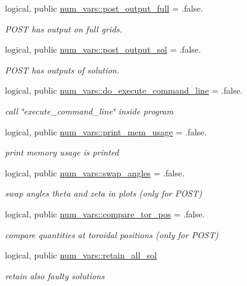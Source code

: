 \begin{DoxyCompactItemize}
logical, public \hyperlink{namespacenum__vars_a7d65e7e9a9c8d9882929fc014b81a81b}{num\+\_\+vars\+::post\+\_\+output\+\_\+full} = .false.
\begin{DoxyCompactList}\small\item\em P\+O\+ST has output on full grids. \end{DoxyCompactList}\item 
logical, public \hyperlink{namespacenum__vars_a500deb6ae4c6ba1171c44513e1aac62b}{num\+\_\+vars\+::post\+\_\+output\+\_\+sol} = .false.
\begin{DoxyCompactList}\small\item\em P\+O\+ST has outputs of solution. \end{DoxyCompactList}\item 
logical, public \hyperlink{namespacenum__vars_ad5ba241cde0a99cdd5b3d6a6c0340e5c}{num\+\_\+vars\+::do\+\_\+execute\+\_\+command\+\_\+line} = .false.
\begin{DoxyCompactList}\small\item\em call \char`\"{}execute\+\_\+command\+\_\+line\char`\"{} inside program \end{DoxyCompactList}\item 
logical, public \hyperlink{namespacenum__vars_a28bf4f706f43af630ecc697dec01654c}{num\+\_\+vars\+::print\+\_\+mem\+\_\+usage} = .false.
\begin{DoxyCompactList}\small\item\em print memory usage is printed \end{DoxyCompactList}\item 
logical, public \hyperlink{namespacenum__vars_adaf8e128a1b232b8231305be41a55bdc}{num\+\_\+vars\+::swap\+\_\+angles} = .false.
\begin{DoxyCompactList}\small\item\em swap angles theta and zeta in plots (only for P\+O\+ST) \end{DoxyCompactList}\item 
logical, public \hyperlink{namespacenum__vars_a2f303733b113f96fad56bb8ceb337c85}{num\+\_\+vars\+::compare\+\_\+tor\+\_\+pos} = .false.
\begin{DoxyCompactList}\small\item\em compare quantities at toroidal positions (only for P\+O\+ST) \end{DoxyCompactList}\item 
logical, public \hyperlink{namespacenum__vars_adc6255c76bb27f763817adc8e2d80658}{num\+\_\+vars\+::retain\+\_\+all\+\_\+sol}
\begin{DoxyCompactList}\small\item\em retain also faulty solutions \end{DoxyCompactList}\item 

\end{DoxyCompactItemize}
